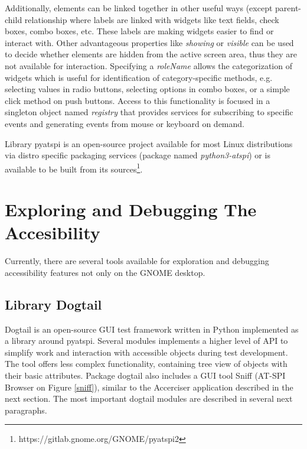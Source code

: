 Additionally, elements can be linked together in other useful ways (except parent-child relationship where labels are linked with widgets like text fields, check boxes, combo boxes, etc. These labels are making widgets easier to find or interact with. Other advantageous properties like \textit{showing} or \textit{visible} can be used to decide whether elements are hidden from the active screen area, thus they are not available for interaction. Specifying a \textit{roleName} allows the categorization of widgets which is useful for identification of category-specific methods, e.g. selecting values in radio buttons, selecting options in combo boxes, or a simple click method on push buttons. Access to this functionality is focused in a singleton object named \textit{registry} that provides services for subscribing to specific events and generating events from mouse or keyboard on demand.

Library pyatspi is an open-source project available for most Linux distributions via distro specific packaging services (package named \textit{python3-atspi}) or is available to be built from its sources\footnote{https://gitlab.gnome.org/GNOME/pyatspi2}.

\section{Exploring and Debugging The Accesibility}
Currently, there are several tools available for exploration and debugging accessibility features not only on the GNOME desktop. 
\subsection{Library Dogtail}\label{sniff_accerciser}
Dogtail is an open-source GUI test framework written in Python implemented as a library around pyatspi. Several modules implements a higher level of API to simplify work and interaction with accessible objects during test development. The tool offers less complex functionality, containing tree view of objects with their basic attributes\cite{dogtail_doc}. Package dogtail also includes a GUI tool Sniff (AT-SPI Browser on Figure \ref{sniff}), similar to the Accerciser application described in the next section. The most important dogtail modules are described in several next paragraphs.

